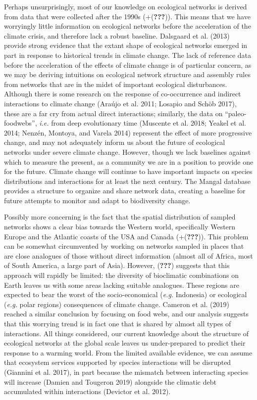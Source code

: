 \documentclass[11pt]{article}
\begin{document}
Perhaps unsurprisingly, most of our knowledge on ecological networks is
derived from data that were collected after the 1990s
(+({\textbf{???}})). This means that we have worryingly little
information on ecological networks before the acceleration of the
climate crisis, and therefore lack a robust baseline. Dalsgaard et al.
(2013) provide strong evidence that the extant shape of ecological
networks emerged in part in response to historical trends in climate
change. The lack of reference data before the acceleration of the
effects of climate change is of particular concern, as we may be
deriving intuitions on ecological network structure and assembly rules
from networks that are in the midst of important ecological
disturbances. Although there is some research on the response of
co-occurrence and indirect interactions to climate change (Araújo et al.
2011; Losapio and Schöb 2017), these are a far cry from actual direct
interactions; similarly, the data on ``paleo-foodwebs'', \emph{i.e.}
from deep evolutionary time (Muscente et al. 2018; Yeakel et al. 2014;
Nenzén, Montoya, and Varela 2014) represent the effect of more
progressive change, and may not adequately inform us about the future of
ecological networks under severe climate change. However, though we lack
baselines against which to measure the present, as a community we are in
a position to provide one for the future. Climate change will continue
to have important impacts on species distributions and interactions for
at least the next century. The Mangal database provides a structure to
organize and share network data, creating a baseline for future attempts
to monitor and adapt to biodiversity change.

Possibly more concerning is the fact that the spatial distribution of
sampled networks shows a clear bias towards the Western world,
specifically Western Europe and the Atlantic coasts of the USA and
Canada (+({\textbf{???}})). This problem can be somewhat circumvented by
working on networks sampled in places that are close analogues of those
without direct information (almost all of Africa, most of South America,
a large part of Asia). However, ({\textbf{???}}) suggests that this
approach will rapidly be limited: the diversity of bioclimatic
combinations on Earth leaves us with some areas lacking suitable
analogues. These regions are expected to bear the worst of the
socio-economical (\emph{e.g.} Indonesia) or ecological (\emph{e.g.}
polar regions) consequences of climate change. Cameron et al. (2019)
reached a similar conclusion by focusing on food webs, and our analysis
suggests that this worrying trend is in fact one that is shared by
almost all types of interactions. All things considered, our current
knowledge about the structure of ecological networks at the global scale
leaves us under-prepared to predict their response to a warming world.
From the limited available evidence, we can assume that ecosystem
services supported by species interactions will be disrupted (Giannini
et al. 2017), in part because the mismatch between interacting species
will increase (Damien and Tougeron 2019) alongside the climatic debt
accumulated within interactions (Devictor et al. 2012).
\end{document}
